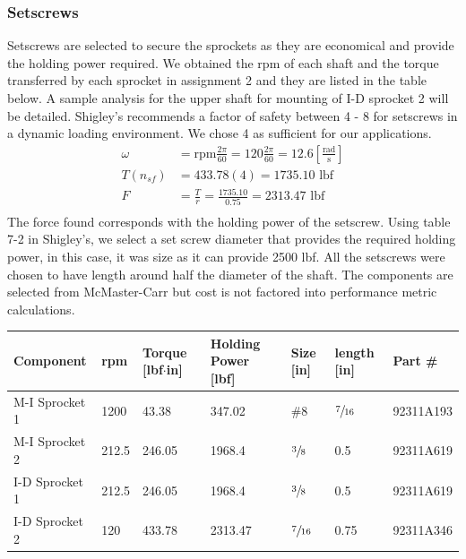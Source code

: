 \documentclass[letterpaper,12pt]{article}
\begin{document}
\subsubsection{Setscrews}
Setscrews are selected to secure the sprockets as they are economical and provide the holding power required. We obtained the rpm of each shaft and the torque transferred by each sprocket in assignment 2 and they are listed in the table below. A sample analysis for the upper shaft for mounting of I-D sprocket 2 will be detailed. 
Shigley's recommends a factor of safety between 4 - 8 for setscrews in a dynamic loading environment. We chose 4 as sufficient for our applications. 
\begin{align*}
    \omega &= \text{rpm}\frac{2\pi}{60} = 120\frac{2\pi}{60} = 12.6 \left[\frac{\text{rad}}{\text{s}}\right] \\
    T (n_{sf}) &= 433.78(4) = 1735.10 \text{ lbf} \tag{apply factor of safety}\\
    F &= \frac{T}{r} = \frac{1735.10}{0.75} = 2313.47 \text{ lbf} \tag{force applying the torque}\\
\end{align*}
The force found corresponds with the holding power of the setscrew. Using table 7-2 in Shigley's, we select a set screw diameter that provides the required holding power, in this case, it was size  as it can provide 2500 lbf. All the setscrews were chosen to have length around half the diameter of the shaft. The components are selected from McMaster-Carr but cost is not factored into performance metric calculations. 
\begin{center}
	\begin{tabular}{ |p{2.5cm}||p{1.25cm}|p{1.25cm}|p{1.25cm}|p{1cm}|p{1.25cm}|p{2cm}|}
		\hline
		Component & rpm & Torque [lbf$\cdot$in] & Holding Power [lbf] & Size [in] & length [in] & Part \# \\
		\hline
		M-I Sprocket 1 & 1200 & 43.38 & 347.02 & \#8 &$\sfrac{7}{16}$ & 92311A193\\
	    M-I Sprocket 2 & 212.5 & 246.05 & 1968.4 & $\sfrac{3}{8}$ &0.5& 92311A619\\
		I-D Sprocket 1  & 212.5 & 246.05&  1968.4  & $\sfrac{3}{8}$&0.5& 92311A619\\
		I-D Sprocket 2 & 120 & 433.78  & 2313.47 & $\sfrac{7}{16}$ & 0.75 & 92311A346\\
		\hline
	\end{tabular}
\end{center}
\end{document}

